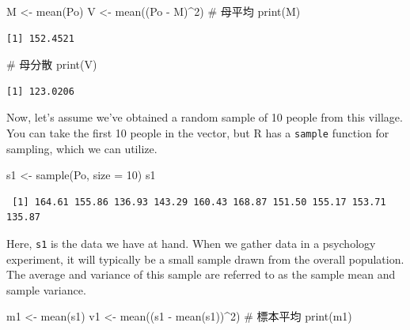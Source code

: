 \documentclass[
  a4paper,
]{book}
\newenvironment{Shaded}{\begin{snugshade}}{\end{snugshade}}
\newcommand{\AttributeTok}[1]{\textcolor[rgb]{0.40,0.45,0.13}{#1}}
\newcommand{\CommentTok}[1]{\textcolor[rgb]{0.37,0.37,0.37}{#1}}
\newcommand{\DecValTok}[1]{\textcolor[rgb]{0.68,0.00,0.00}{#1}}
\newcommand{\FunctionTok}[1]{\textcolor[rgb]{0.28,0.35,0.67}{#1}}
\newcommand{\NormalTok}[1]{\textcolor[rgb]{0.00,0.23,0.31}{#1}}
\newcommand{\OtherTok}[1]{\textcolor[rgb]{0.00,0.23,0.31}{#1}}
\newcommand{\SpecialCharTok}[1]{\textcolor[rgb]{0.37,0.37,0.37}{#1}}
\begin{document}
\begin{Shaded}
\begin{Highlighting}[]
\NormalTok{M }\OtherTok{\textless{}{-}} \FunctionTok{mean}\NormalTok{(Po)}
\NormalTok{V }\OtherTok{\textless{}{-}} \FunctionTok{mean}\NormalTok{((Po }\SpecialCharTok{{-}}\NormalTok{ M)}\SpecialCharTok{\^{}}\DecValTok{2}\NormalTok{)}
\CommentTok{\# 母平均}
\FunctionTok{print}\NormalTok{(M)}
\end{Highlighting}
\end{Shaded}

\begin{verbatim}
[1] 152.4521
\end{verbatim}

\begin{Shaded}
\begin{Highlighting}[]
\CommentTok{\# 母分散}
\FunctionTok{print}\NormalTok{(V)}
\end{Highlighting}
\end{Shaded}

\begin{verbatim}
[1] 123.0206
\end{verbatim}

Now, let's assume we've obtained a random sample of 10 people from this
village. You can take the first 10 people in the vector, but R has a
\texttt{sample} function for sampling, which we can utilize.

\begin{Shaded}
\begin{Highlighting}[]
\NormalTok{s1 }\OtherTok{\textless{}{-}} \FunctionTok{sample}\NormalTok{(Po, }\AttributeTok{size =} \DecValTok{10}\NormalTok{)}
\NormalTok{s1}
\end{Highlighting}
\end{Shaded}

\begin{verbatim}
 [1] 164.61 155.86 136.93 143.29 160.43 168.87 151.50 155.17 153.71 135.87
\end{verbatim}

Here, \texttt{s1} is the data we have at hand. When we gather data in a
psychology experiment, it will typically be a small sample drawn from
the overall population. The average and variance of this sample are
referred to as the sample mean and sample variance.

\begin{Shaded}
\begin{Highlighting}[]
\NormalTok{m1 }\OtherTok{\textless{}{-}} \FunctionTok{mean}\NormalTok{(s1)}
\NormalTok{v1 }\OtherTok{\textless{}{-}} \FunctionTok{mean}\NormalTok{((s1 }\SpecialCharTok{{-}} \FunctionTok{mean}\NormalTok{(s1))}\SpecialCharTok{\^{}}\DecValTok{2}\NormalTok{)}
\CommentTok{\# 標本平均}
\FunctionTok{print}\NormalTok{(m1)}
\end{Highlighting}
\end{Shaded}
\end{document}
